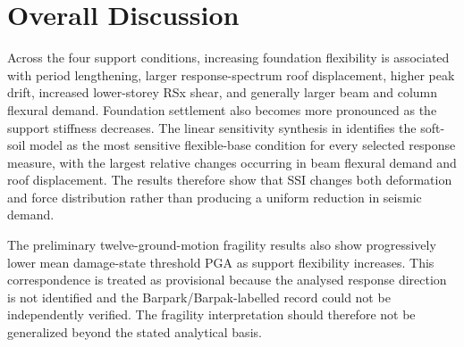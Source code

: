 \section{Overall Discussion}
Across the four support conditions, increasing foundation flexibility is associated with period lengthening, larger response-spectrum roof displacement, higher peak drift, increased lower-storey RSx shear, and generally larger beam and column flexural demand. Foundation settlement also becomes more pronounced as the support stiffness decreases. The linear sensitivity synthesis in  identifies the soft-soil model as the most sensitive flexible-base condition for every selected response measure, with the largest relative changes occurring in beam flexural demand and roof displacement. The results therefore show that SSI changes both deformation and force distribution rather than producing a uniform reduction in seismic demand.

The preliminary twelve-ground-motion fragility results also show progressively lower mean damage-state threshold PGA as support flexibility increases. This correspondence is treated as provisional because the analysed response direction is not identified and the Barpark/Barpak-labelled record could not be independently verified. The fragility interpretation should therefore not be generalized beyond the stated analytical basis.
